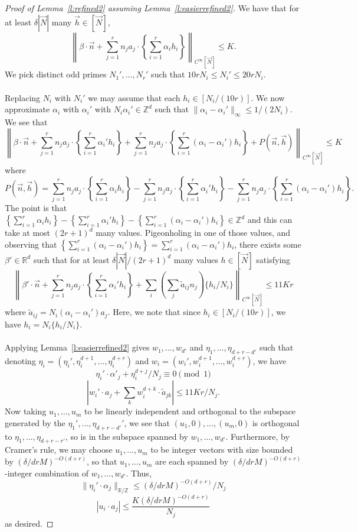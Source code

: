 \documentclass[11pt, a4paper]{amsart}
\theoremstyle{plain}
\theoremstyle{plain}
\theoremstyle{definition}
\theoremstyle{remark}
\numberwithin{equation}{section}
\numberwithin{lemma}{section}
\numberwithin{proposition}{section}
\numberwithin{corollary}{section}
\numberwithin{definition}{section}
\numberwithin{claim}{section}
\begin{document}
\begin{proof}[Proof of Lemma~\ref{l:refined2} assuming Lemma~\ref{l:easierrefined2}]
We have that for at least $\delta |\vec{N}|$ many $\vec{h} \in [\vec{N}]$,
$$\left\|\beta \cdot \vec{n} +  \sum_{j = 1}^r n_j a_j \cdot \left\{\sum_{i = 1}^r \alpha_i h_i\right\}\right\|_{C^\infty[\vec{N}]} \le K.$$
We pick distinct odd primes $N_1', \dots, N_r'$ such that $10rN_i \le N_i' \le 20rN_i$. \\\\
Replacing $N_i$ with $N_i'$ we may assume that each $h_i \in [N_i/(10r)]$. We now approximate $\alpha_i$ with $\alpha_i'$ with $N_i\alpha_i' \in \mathbb{Z}^d$ such that $\|\alpha_i - \alpha_i'\|_\infty \le 1/(2N_i)$. We see that
$$\left\|\beta \cdot \vec{n} + \sum_{j = 1}^r n_j a_j \cdot \left\{\sum_{i = 1}^r \alpha_i' h_i\right\} + \sum_{j = 1}^r n_j a_j \cdot \left\{\sum_{i = 1}^r (\alpha_i - \alpha_i')h_i\right\} + P(\vec{n}, \vec{h})\right\|_{C^\infty[\vec{N}]} \le K$$
where
$$P(\vec{n}, \vec{h}) = \sum_{j = 1}^r n_j a_j \cdot \left\{\sum_{i = 1}^r \alpha_i h_i\right\} - \sum_{j = 1}^r n_j a_j \cdot \left\{\sum_{i = 1}^r \alpha_i' h_i\right\} - \sum_{j = 1}^r n_j a_j \cdot \left\{\sum_{i = 1}^r (\alpha_i - \alpha_i')h_i\right\}.$$
The point is that $\left\{\sum_{i = 1}^r \alpha_i h_i\right\} - \left\{\sum_{i = 1}^r \alpha_i' h_i\right\} - \left\{\sum_{i = 1}^r (\alpha_i - \alpha_i')h_i\right\} \in \mathbb{Z}^d$ and this can take at most $(2r + 1)^d$ many values. Pigeonholing in one of those values, and observing that $\left\{\sum_{i = 1}^r (\alpha_i - \alpha_i')h_i\right\} = \sum_{i = 1}^r (\alpha_i - \alpha_i')h_i$, there exists some $\beta' \in \mathbb{R}^d$ such that for at least $\delta|\vec{N}|/(2r + 1)^{d}$ many values $h \in [\vec{N}]$ satisfying 
$$\left\|\beta' \cdot \vec{n} +  \sum_{j = 1}^r n_j a_j \cdot \left\{\sum_{i = 1}^r \alpha_i' h_i\right\} + \sum_i \left(\sum_{j} \tilde{a}_{ij} n_j\right)\{h_i/N_i\}\right\|_{C^\infty[\vec{N}]} \le 11Kr$$
where $\tilde{a}_{ij} = N_i(\alpha_i - \alpha_i')a_j$. Here, we note that since $h_i \in [N_i/(10r)]$, we have $h_i = N_i\{h_i/N_i\}$. \\\\
Applying Lemma~\ref{l:easierrefined2} gives $w_1, \dots, w_{d'}$ and $\eta_1, \dots, \eta_{d + r - d'}$ such that denoting $\eta_i = (\eta_i', \eta_i^{d+1}, \dots, \eta_i^{d + r})$ and $w_i = (w_i', w_i^{d+1}, \dots, w_i^{d + r})$, we have
$$\eta_i' \cdot \alpha'_j + \eta_i^{d+j} /N_j \equiv 0 \pmod{1}$$
$$|w_i' \cdot a_j + \sum_k w_i^{d+k} \cdot \tilde{a}_{jk}| \le 11Kr/N_j.$$
Now taking $u_1, \dots, u_m$ to be linearly independent and orthogonal to the subspace generated by the $\eta_1', \dots, \eta_{d + r - d'}'$, we see that $(u_1, 0), \dots, (u_m, 0)$ is orthogonal to $\eta_1, \dots, \eta_{d + r - r'}$, so is in the subspace spanned by $w_1, \dots, w_{d'}$. Furthermore, by Cramer's rule, we may choose $u_1, \dots, u_m$ to be integer vectors with size bounded by $(\delta/drM)^{-O(d + r)}$, so that $u_1, \dots, u_m$ are each spanned by $(\delta/drM)^{-O(d + r)}$-integer combination of $w_1, \dots, w_{d'}$. Thus,
$$\|\eta_i' \cdot \alpha_j\|_{\mathbb{R}/\mathbb{Z}} \le (\delta/drM)^{-O(d + r)}/N_j$$
$$|u_i \cdot a_j| \le \frac{K(\delta/drM)^{-O(d + r)}}{N_j}$$
as desired. 
\end{proof}
\end{document}
